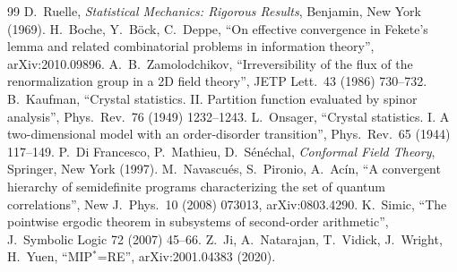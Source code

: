 \documentclass[11pt]{article}
\theoremstyle{definition}\newtheorem{definition}{Definition}[section]
\theoremstyle{remark}\newtheorem*{remark}{Remark}
\begin{document}
\begin{thebibliography}{99}
 D.~Ruelle, \emph{Statistical Mechanics: Rigorous Results}, Benjamin, New York (1969).
 H.~Boche, Y.~B\"ock, C.~Deppe, ``On effective convergence in Fekete's lemma and related combinatorial problems in information theory'', arXiv:2010.09896.
 A.~B.~Zamolodchikov, ``Irreversibility of the flux of the renormalization group in a 2D field theory'', JETP Lett.\ 43 (1986) 730--732.
 B.~Kaufman, ``Crystal statistics. II. Partition function evaluated by spinor analysis'', Phys.\ Rev.\ 76 (1949) 1232--1243.
 L.~Onsager, ``Crystal statistics. I. A two-dimensional model with an order-disorder transition'', Phys.\ Rev.\ 65 (1944) 117--149.
 P.~Di Francesco, P.~Mathieu, D.~S\'en\'echal, \emph{Conformal Field Theory}, Springer, New York (1997).
 M.~Navascu\'es, S.~Pironio, A.~Ac\'in, ``A convergent hierarchy of semidefinite programs characterizing the set of quantum correlations'', New J.\ Phys.\ 10 (2008) 073013, arXiv:0803.4290.
 K.~Simic, ``The pointwise ergodic theorem in subsystems of second-order arithmetic'', J.\ Symbolic Logic 72 (2007) 45--66.
 Z.~Ji, A.~Natarajan, T.~Vidick, J.~Wright, H.~Yuen, ``MIP$^*$=RE'', arXiv:2001.04383 (2020).
\end{thebibliography}
\endgroup
\end{document}
